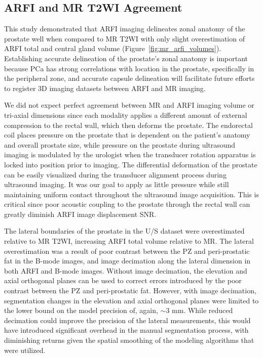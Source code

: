 \subsection{ARFI and MR T2WI Agreement}
This study demonstrated that ARFI imaging delineates zonal anatomy of the
prostate well when compared to MR T2WI with only slight overestimation of ARFI
total and central gland volume (Figure~\ref{fig:mr_arfi_volumes}).
Establishing accurate delineation of the prostate's zonal anatomy is important
because PCa has strong correlations with location in the prostate, specifically
in the peripheral zone, and accurate capsule delineation will facilitate
future efforts to register 3D imaging datasets between ARFI and MR imaging. 

We did not expect perfect agreement between MR and ARFI imaging volume or
tri-axial dimensions since each modality applies a different amount of external
compression to the rectal wall, which then deforms the prostate.  The
endorectal coil places pressure on the prostate that is dependent on the
patient's anatomy and overall prostate size, while pressure on the prostate
during ultrasound imaging is modulated by the urologist when the transducer
rotation apparatus is locked into position prior to imaging.  The differential
deformation of the prostate can be easily visualized during the transducer
alignment process during ultrasound imaging.  It was our goal to apply as
little pressure while still maintaining uniform contact throughout the
ultrasound image acquisition. This is critical since poor acoustic coupling to
the prostate through the rectal wall can greatly diminish ARFI image
displacement SNR.

The lateral boundaries of the prostate in the U/S dataset were overestimated
relative to MR T2WI, increasing ARFI total volume relative to MR. The lateral
overestimation was a result of poor contrast between the PZ and peri-prostatic
fat in the B-mode images, and image decimation along the lateral dimension in
both ARFI and B-mode images. Without image decimation, the elevation and axial
orthogonal planes can be used to correct errors introduced by the poor contrast
between the PZ and peri-prostatic fat. However, with image decimation,
segmentation changes in the elevation and axial orthogonal planes were limited
to the lower bound on the model precision of, again, $\sim$3 mm.  While reduced
decimation could improve the precision of the lateral measurements, this would
have introduced significant overhead in the manual segmentation process, with
diminishing returns given the spatial smoothing of the modeling algorithms that
were utilized. 

